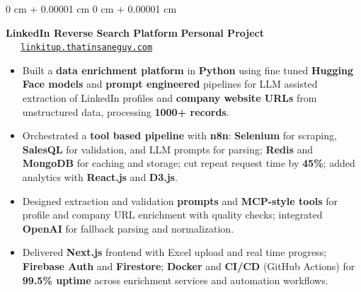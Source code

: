 \documentclass[10pt, letterpaper]{article}
\newenvironment{highlights}{
    \begin{itemize}[
        topsep=0.10 cm,
        parsep=0.10 cm,
        partopsep=0pt,
        itemsep=0pt,
        leftmargin=0 cm + 10pt
    ]
}{
    \end{itemize}
} %
\newenvironment{onecolentry}{
    \begin{adjustwidth}{
        0 cm + 0.00001 cm
    }{
        0 cm + 0.00001 cm
    }
}{
    \end{adjustwidth}
} %
\begin{document}
\begin{onecolentry}
	\textbf{LinkedIn Reverse Search Platform} \hfill \textbf{Personal Project} \ \ \ \href{http://linkitup.thatinsaneguy.com/}{\texttt{linkitup.thatinsaneguy.com}}
	\begin{highlights}
		\item Built a \textbf{data enrichment platform} in \textbf{Python} using fine tuned \textbf{Hugging Face models} and \textbf{prompt engineered} pipelines for LLM assisted extraction of LinkedIn profiles and \textbf{company website URLs} from unstructured data, processing \textbf{1000+ records}.
		\item Orchestrated a \textbf{tool based pipeline} with \textbf{n8n}: \textbf{Selenium} for scraping, \textbf{SalesQL} for validation, and LLM prompts for parsing; \textbf{Redis} and \textbf{MongoDB} for caching and storage; cut repeat request time by \textbf{45\%}; added analytics with \textbf{React.js} and \textbf{D3.js}.
		\item Designed extraction and validation \textbf{prompts} and \textbf{MCP-style tools} for profile and company URL enrichment with quality checks; integrated \textbf{OpenAI} for fallback parsing and normalization.
		\item Delivered \textbf{Next.js} frontend with Excel upload and real time progress; \textbf{Firebase Auth} and \textbf{Firestore}; \textbf{Docker} and \textbf{CI/CD} (GitHub Actions) for \textbf{99.5\% uptime} across enrichment services and automation workflows.
	\end{highlights}
\end{onecolentry}


\vspace{0.15 cm}
\end{document}

